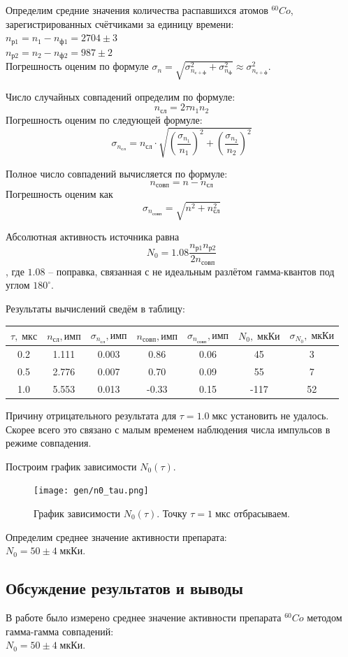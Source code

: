 \documentclass[10pt,a4paper]{article}
\begin{document}
	Определим средние значения количества распавшихся атомов ${}^{60}Co$, зарегистрированных счётчиками за единицу времени:\\
	$n_{р1} = n_{1} - n_{ф1} = 2704 \pm 3$\\
	$n_{р2} = n_{2} - n_{ф2} = 987  \pm 2$\\
	Погрешность оценим по формуле $\sigma_{n} = \sqrt{\sigma_{n_{с+ф}}^2 + \sigma_{n_ф}^2} \approx \sigma_{n_{с+ф}}^2$.
	
	Число случайных совпадений определим по формуле:
	$$n_{сл} = 2 \tau n_{1} n_{2}$$
	Погрешность оценим по следующей формуле:
	$$\sigma_{n_{сл}} = n_{сл} \cdot \sqrt{ \left(\frac{\sigma_{n_1}}{n_1}\right)^2 + \left(\frac{\sigma_{n_2}}{n_2}\right)^2 }$$
	
	Полное число совпадений вычисляется по формуле:
	$$
	n_{совп} = n - n_{сл}
	$$
	Погрешность оценим как
	$$
	\sigma_{n_{совп}} = \sqrt{n^2 + n_{сл}^2}
	$$
	
	Абсолютная активность источника равна
	$$
	N_0 = 1.08 \frac{n_{р1} n_{р2}}{2 n_{совп}}
	$$,
	где $1.08$ -- поправка, связанная с не идеальным разлётом гамма-квантов под углом $180^\circ$.
	
	Результаты вычислений сведём в таблицу:\\
	\begin{tabular}{ccccccc}
		\hline
		$\tau, \; мкс$ & $n_{сл}, имп$ & $\sigma_{n_{сл}}, имп$ & $n_{совп}, имп$ & $\sigma_{n_{совп}}, имп$ & $N_0, \; мкКи$ & $\sigma_{N_0}, \; мкКи$ \\
		\hline
		0.2 & 1.111 & 0.003 & 0.86 & 0.06 & 45 & 3 \\
		0.5 & 2.776 & 0.007 & 0.70 & 0.09 & 55 & 7 \\
		1.0 & 5.553 & 0.013 & -0.33 & 0.15 & -117 & 52 \\ 
		\hline
	\end{tabular}

	Причину отрицательного результата для $\tau = 1.0 \; мкс$ установить не удалось. Скорее всего это связано с малым временем наблюдения числа импульсов в режиме совпадения.

	Построим график зависимости $N_0(\tau)$.
	\begin{figure}
		\centering
		\texttt{[image: gen/n0\_tau.png]}
		\caption{График зависимости $N_0(\tau)$. Точку $\tau=1 \; мкс$ отбрасываем.}
	\end{figure}

	Определим среднее значение активности препарата:\\
	$N_0 = 50 \pm 4 \; мкКи$.
	
	\subsection*{Обсуждение результатов и выводы}
	
	В работе было измерено среднее значение активности препарата ${}^{60} Co$ методом гамма-гамма совпадений:\\
	$N_0 = 50 \pm 4 \; мкКи$.
		
\end{document}
